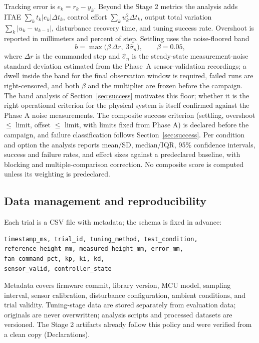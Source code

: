\documentclass[10pt,twocolumn]{article}
\begin{document}
Tracking error is $e_k = r_k - y_k$. Beyond the Stage 2 metrics the analysis adds ITAE $\sum_k t_k |e_k| \Delta t_k$, control effort $\sum_k u_k^2 \Delta t_k$, output total variation $\sum_k |u_k - u_{k-1}|$, disturbance recovery time, and tuning success rate. Overshoot is reported in millimeters and percent of step. Settling uses the noise-floored band
\begin{equation}
b = \max\!\bigl(\beta\,\Delta r,\; 3\hat{\sigma}_n\bigr), \qquad \beta = 0.05,
\label{eq:band}
\end{equation}
where $\Delta r$ is the commanded step and $\hat{\sigma}_n$ is the steady-state measurement-noise standard deviation estimated from the Phase~A sensor-validation recordings; a dwell inside the band for the final observation window is required, failed runs are right-censored, and both $\beta$ and the multiplier are frozen before the campaign. The band analysis of Section~\ref{sec:success} motivates this floor; whether it is the right operational criterion for the physical system is itself confirmed against the Phase A noise measurements. The composite success criterion (settling, overshoot $\le$ limit, offset $\le$ limit, with limits fixed from Phase A) is declared before the campaign, and failure classification follows Section~\ref{sec:success}. Per condition and option the analysis reports mean/SD, median/IQR, 95\% confidence intervals, success and failure rates, and effect sizes against a predeclared baseline, with blocking and multiple-comparison correction. No composite score is computed unless its weighting is predeclared.

\subsection{Data management and reproducibility}

Each trial is a CSV file with metadata; the schema is fixed in advance:

\begin{scriptsize}
\begin{verbatim}
timestamp_ms, trial_id, tuning_method, test_condition,
reference_height_mm, measured_height_mm, error_mm,
fan_command_pct, kp, ki, kd,
sensor_valid, controller_state
\end{verbatim}
\end{scriptsize}

\noindent Metadata covers firmware commit, library version, MCU model, sampling interval, sensor calibration, disturbance configuration, ambient conditions, and trial validity. Tuning-stage data are stored separately from evaluation data; originals are never overwritten; analysis scripts and processed datasets are versioned. The Stage 2 artifacts already follow this policy and were verified from a clean copy (Declarations).
\end{document}
